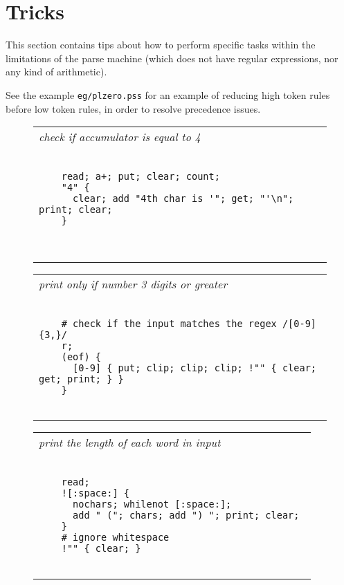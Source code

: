 \documentclass[a4paper,12pt]{article}
\begin{document}
\section{Tricks}

  This section contains tips about how to perform specific tasks
  within the limitations of the parse machine (which does not have
  regular expressions, nor any kind of arithmetic).

  See the example \texttt{eg/plzero.pss} for an example of reducing high
  token rules before low token rules, in order to resolve
  precedence issues.
 \begin{figure}
 \begin{tabular}{ l }
 \emph{ check if accumulator is equal to 4 } \\ 
 \begin{lstlisting}[breaklines] 

    read; a+; put; clear; count; 
    "4" {  
      clear; add "4th char is '"; get; "'\n"; print; clear;
    }
    
  
 \end{lstlisting} 
 \end{tabular} 

 \end{figure}
 \begin{figure}
 \begin{tabular}{ l }
 \emph{ print only if number 3 digits or greater } \\ 
 \begin{lstlisting}[breaklines] 

    # check if the input matches the regex /[0-9]{3,}/
    r;
    (eof) {
      [0-9] { put; clip; clip; clip; !"" { clear; get; print; } }
    }
  
 \end{lstlisting} 
 \end{tabular} 

 \end{figure}
 \begin{figure}
 \begin{tabular}{ l }
 \emph{ print the length of each word in input  } \\ 
 \begin{lstlisting}[breaklines] 

    read; 
    ![:space:] { 
      nochars; whilenot [:space:]; 
      add " ("; chars; add ") "; print; clear; 
    }
    # ignore whitespace
    !"" { clear; }
  
 \end{lstlisting} 
 \end{tabular} 

 \end{figure}
\end{document}
